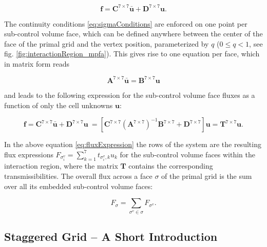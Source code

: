 \begin{equation}
    \mathbf{f} = \mathbf{C}^{7 \times 7} \mathbf{\bar{u}} + \mathbf{D}^{7 \times 7} \mathbf{u}.
    \label{eq:fluxesInInteractionVolume}
\end{equation}

The continuity conditions \eqref{eq:sigmaConditions} are enforced on one point per sub-control volume face, which can be defined anywhere between the center of the face of the primal grid and the vertex position, parameterized by $q$ ($0 \leq q < 1$, see fig. \ref{fig:interactionRegion_mpfa}). This gives rise to one equation per face, which in matrix form reads

\begin{equation}
    \mathbf{A}^{7 \times 7} \mathbf{\bar{u}} = \mathbf{B}^{7 \times 7} \mathbf{u}
    \label{eq:localSystem}
\end{equation}

and leads to the following expression for the sub-control volume face fluxes as a function of only the cell unknowns $\mathbf{u}$:

\begin{equation}
    \mathbf{f} = \mathbf{C}^{7 \times 7} \mathbf{\bar{u}} + \mathbf{D}^{7 \times 7} \mathbf{u} \
               = \left[ \mathbf{C}^{7 \times 7} \left( \mathbf{A}^{7 \times 7} \right)^{-1} \mathbf{B}^{7 \times 7} + \mathbf{D}^{7 \times 7} \right] \mathbf{u} = \mathbf{T}^{7 \times 7} \mathbf{u}.
    \label{eq:fluxExpression}
\end{equation}

In the above equation \eqref{eq:fluxExpression} the rows of the system are the resulting flux expressions $F_{\sigma^v_i} = \sum_{k = 1}^7 t_{\sigma^v_i, k} u_{k}$ for the sub-control volume faces within the interaction region, where the matrix $\mathbf{T}$ contains the corresponding transmissibilities. The overall flux across a face $\sigma$ of the primal grid is the sum over all its embedded sub-control volume faces:

\begin{equation}
    F_{\sigma} = \sum_{\sigma^v \in \sigma} F_{\sigma^v}.
\end{equation}

\subsection{Staggered Grid -- A Short Introduction}\label{staggered}

